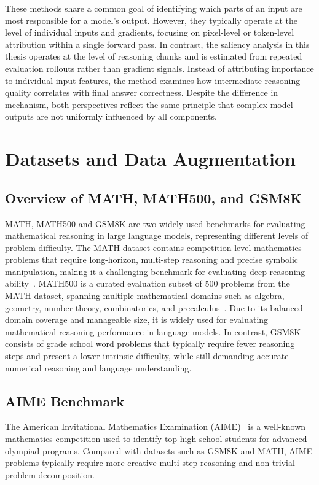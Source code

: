 \documentclass[12pt]{report}
\begin{document}
These methods share a common goal of identifying which parts of an input are most responsible for a model's output. However, they typically operate at the level of individual inputs and gradients, focusing on pixel-level or token-level attribution within a single forward pass. 
In contrast, the saliency analysis in this thesis operates at the level of reasoning chunks and is estimated from repeated evaluation rollouts rather than gradient signals. Instead of attributing importance to individual input features, the method examines how intermediate reasoning quality correlates with final answer correctness. Despite the difference in mechanism, both perspectives reflect the same principle that complex model outputs are not uniformly influenced by all components.

\section{Datasets and Data Augmentation}
\subsection{Overview of MATH, MATH500, and GSM8K}
MATH, MATH500 and GSM8K are two widely used benchmarks for evaluating mathematical reasoning in large language models, representing different levels of problem difficulty. 
The MATH dataset contains competition-level mathematics problems that require long-horizon, multi-step reasoning and precise symbolic manipulation, making it a challenging benchmark for evaluating deep reasoning ability~\cite{hendrycksmath2021}. 
MATH500 is a curated evaluation subset of 500 problems from the MATH dataset, spanning multiple mathematical domains such as algebra, geometry, number theory, combinatorics, and precalculus~\cite{huggingfaceh4_math500}. Due to its balanced domain coverage and manageable size, it is widely used for evaluating mathematical reasoning performance in language models.
In contrast, GSM8K consists of grade school word problems that typically require fewer reasoning steps and present a lower intrinsic difficulty, while still demanding accurate numerical reasoning and language understanding\cite{cobbe2021trainingverifierssolvemath}.

\subsection{AIME Benchmark}

The American Invitational Mathematics Examination (AIME)~\cite{AIMEProblemsandSolutions-AOPSWiki} is a well-known mathematics competition used to identify top high-school students for advanced olympiad programs. Compared with datasets such as GSM8K and MATH, AIME problems typically require more creative multi-step reasoning and non-trivial problem decomposition.
\end{document}
